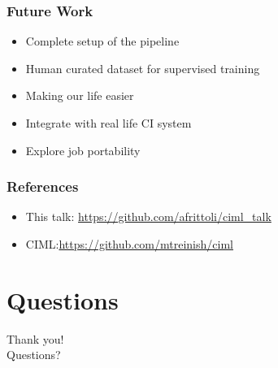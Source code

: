 \documentclass[aspectratio=169,11pt,hyperref={colorlinks=true}]{beamer}
\begin{document}
\begin{frame}
  \frametitle{Future Work}
  \begin{itemize}
      \item{Complete setup of the pipeline}
      \item{Human curated dataset for supervised training}
      \item{Making our life easier}
      \item{Integrate with real life CI system}
      \item{Explore job portability}
  \end{itemize}
\end{frame}

\begin{frame}
  \frametitle{References}
  \begin{itemize}
      \item{This talk: \href{https://github.com/afrittoli/ciml\_talk}{https://github.com/afrittoli/ciml\_talk}}
      \item{CIML:\href{https://github.com/mtreinish/ciml}{https://github.com/mtreinish/ciml}}
  \end{itemize}
\end{frame}

\section{Questions}
\begin{frame}[c]
    \begin{center}
        \Huge Thank you!\\Questions?
    \end{center}
\end{frame}

\end{document}
